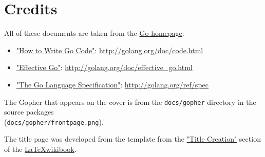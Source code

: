 \cleardoublepage
{}
{}

\chapter*{Credits}

All of these documents are taken from the \href{http://golang.org}{Go homepage}:

\begin{itemize}
  \item \href{http://golang.org/doc/code.html}{"How to Write Go Code"}:
  \url{http://golang.org/doc/code.html}
  \item \href{http://golang.org/doc/effective_go.html}{"Effective Go"}:
  \url{http://golang.org/doc/effective_go.html}
  \item \href{http://golang.org/ref/spec}{"The Go Language Specification"}:
  \url{http://golang.org/ref/spec}
\end{itemize}

The Gopher that appears on the cover is from the \verb|docs/gopher| directory
in the source packages\\
(\verb|docs/gopher/frontpage.png|).

The title page was developed from the template from the
\href{https://en.wikibooks.org/wiki/LaTeX/Title_Creation}{"Title Creation"}
section of the \href{https://en.wikibooks.org/wiki/LaTeX}{\LaTeX wikibook}.
